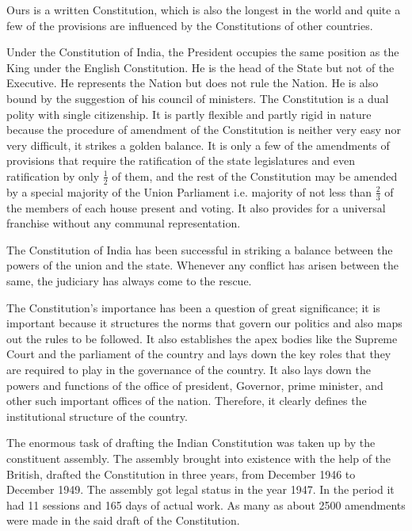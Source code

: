 \begin{multicols}{2}
\noi
Ours is a written Constitution, which is also the longest in the world and quite a few of
the provisions are influenced by the Constitutions of other countries.

\noi
Under the Constitution of India, the President occupies the same position as the King under the English Constitution. He is the head of the State but not of the Executive. He represents the Nation but does not rule the Nation. He is also bound by the suggestion of his council of ministers. The Constitution is a dual polity with single citizenship. It is partly flexible and partly rigid in nature because the procedure of amendment of the Constitution is neither very easy nor very difficult, it strikes a golden balance. It is only a few of the amendments of provisions that require the ratification of the state legislatures and even ratification by only $\frac{1}{2}$ of them, and the rest of the Constitution may be amended by a special majority of the Union Parliament i.e. majority of not less than $\frac{2}{3}$ of the members of each house present and voting. It also provides for a universal franchise without any communal representation.

\noi
The Constitution of India has been successful in striking a balance between the powers
of the union and the state. Whenever any conflict has arisen between the same, the
judiciary has always come to the rescue.

\noi
The Constitution’s importance has been a question of great significance; it is important because it structures the norms that govern our politics and also maps out the rules to be followed. It also establishes the apex bodies like the Supreme Court and the parliament of the country and lays down the key roles that they are required to play in the governance of the country. It also lays down the powers and functions of the office of president, Governor, prime minister, and other such important offices of the nation. Therefore, it clearly defines the institutional structure of the country.


\noi
The enormous task of drafting the Indian Constitution was taken up by the constituent assembly. The assembly brought into existence with the help of the British, drafted the Constitution in three years, from December 1946 to December 1949. The assembly got legal status in the year 1947. In the period it had 11 sessions and 165 days of actual work. As many as about 2500 amendments were made in the said draft of the Constitution.


\end{multicols}
